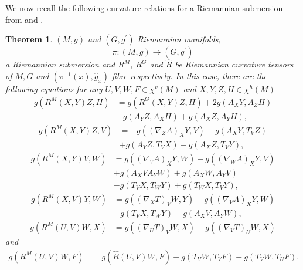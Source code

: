 \documentclass{birkjour}
\newtheorem{theorem}{Theorem}[section]
\theoremstyle{definition}
\theoremstyle{remark}
\numberwithin{equation}{section}
\begin{document}
We now recall the following curvature relations for a Riemannian submersion from \cite{FIP} and \cite{O}.
\begin{theorem}\label{thm1}
	$(M, g)$ and $(G, g^\prime)$ Riemannian manifolds,
	$$\pi: (M, g) \to (G, g^\prime)$$
	a Riemannian submersion and $R^M$, $R^G$ and $\hat{R}$ be Riemannian curvature tensors of $M,G $ and $(\pi^{-1} (x), \hat{g}_x)$ fibre respectively. In this case, there are the following equations for any $U, V, W, F \in \chi^v (M)$ and $X, Y, Z, H \in \chi^h (M)$
	\begin{align}\label{g2}
	g(R^M(X,Y)Z,H) &= g({R}^G(X,Y)Z,H) + 2g(A_X Y, A_Z H)\nonumber \\
	&- g(A_Y Z, A_X H)+ g(A_X Z, A_Y H),
	\end{align}
	\begin{align}\label{g3}
	g(R^M(X,Y)Z,V)&= -g((\nabla_Z A)_X Y, V) - g(A_X Y, T_V Z) \nonumber\\
	&+g(A_Y Z, T_V X)- g(A_X Z, T_V Y),
	\end{align}
	\begin{align}\label{g4}
	g(R^M(X,Y)V,W) &= g((\nabla_V A)_X Y,W)- g((\nabla_W A)_X Y,V)\nonumber \\
	&+ g(A_X V A_Y W)+ g(A_X W, A_Y V) \nonumber\\
	&- g(T_V X, T_W Y)+ g(T_W X, T_V Y),
	\end{align}
	\begin{align}\label{g5}
	g(R^M(X,V)Y,W) &= g((\nabla_X T)_V W,Y)- g((\nabla_V A)_X Y,W)\nonumber \\
	&- g(T_V X, T_W Y)+ g(A_X V, A_Y W),
	\end{align}
	\begin{align}\label{g6}
	g(R^M(U,V)W,X)&=g((\nabla_U T)_V W, X) - g((\nabla_V T)_U W, X)
	\end{align}
	and
	\begin{align}\label{g1}
	g(R^M(U,V)W,F) &=g(\hat{R}(U,V)W,F) + g(T_U W, T_V F)- g(T_V W, T_U F).
	\end{align}
\end{theorem}
\end{document}
